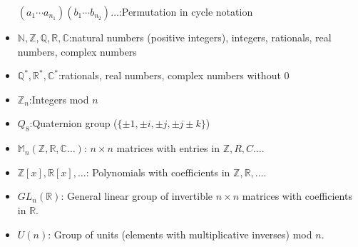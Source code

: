 \begin{itemize}
$(a_1 \cdots a_{n_1})(b_1 \cdots b_{n_2}) \ldots $:\quad Permutation in cycle notation
\item[]
$\mathbb{ N, Z,Q,R,C}$:\quad natural numbers (positive integers), integers, rationals, real numbers, complex numbers
\item[]
$\mathbb{ Q^{\ast},R^{\ast},C^{\ast}}$:\quad  rationals, real numbers, complex numbers without $0$
\item[]
${\mathbb Z}_n$:\quad Integers mod $n$
\item[]
$Q_8$:\quad Quaternion group ($ \{ \pm 1, \pm i, \pm j, \pm j  \pm k \}$)
\item[]
${\mathbb M}_n(\mathbb{ Z,R,C}\ldots)$: \quad $n \times n$ matrices with entries in ${\mathbb Z,R,C}\ldots$.
\item[]
${\mathbb Z}[x],{\mathbb R}[x], \ldots$: \quad Polynomials with coefficients in ${\mathbb Z},{\mathbb R}, \ldots$.
\item[]
$GL_n({\mathbb R})$: \quad General linear group of invertible $n \times n$ matrices with coefficients in ${\mathbb R}$.
\item[]
$U(n)$: \quad Group of units (elements with multiplicative inverses) mod $n$.
\end{itemize}

